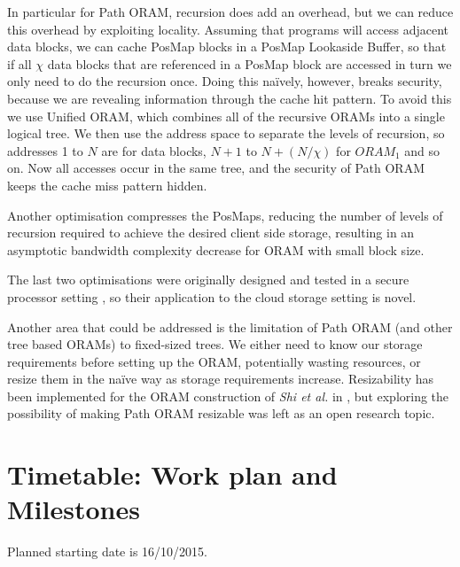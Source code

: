 \documentclass[12pt,a4paper,twoside]{article}
\begin{document}
In particular for Path ORAM, recursion does add an overhead, but we can reduce this overhead by exploiting locality. Assuming that programs will access adjacent data blocks, we can cache PosMap blocks in a PosMap Lookaside Buffer, so that if all $\chi$ data blocks that are referenced in a PosMap block are accessed in turn we only need to do the recursion once. Doing this na\"ively, however, breaks security, because we are revealing information through the cache hit pattern. To avoid this we use Unified ORAM, which combines all of the recursive ORAMs into a single logical tree. We then use the address space to separate the levels of recursion, so addresses 1 to $N$ are for data blocks, $N + 1$ to $N + (N / \chi)$ for $ORAM_1$ and so on. Now all accesses occur in the same tree, and the security of Path ORAM keeps the cache miss pattern hidden.

Another optimisation compresses the PosMaps, reducing the number of levels of recursion required to achieve the desired client side storage, resulting in an asymptotic bandwidth complexity decrease for ORAM with small block size.

The last two optimisations were originally designed and tested in a secure processor setting \cite{ren2014unified}, so their application to the cloud storage setting is novel.

Another area that could be addressed is the limitation of Path ORAM (and other tree based ORAMs) to fixed-sized trees. We either need to know our storage requirements before setting up the ORAM, potentially wasting resources, or resize them in the na\"ive way as storage requirements increase. Resizability has been implemented for the ORAM construction of \emph{Shi et al.} \cite{shi2011oblivious} in \cite{moataz2015resizable}, but exploring the possibility of making Path ORAM resizable was left as an open research topic.

\section*{Timetable: Work plan and Milestones}

Planned starting date is 16/10/2015.
\end{document}
